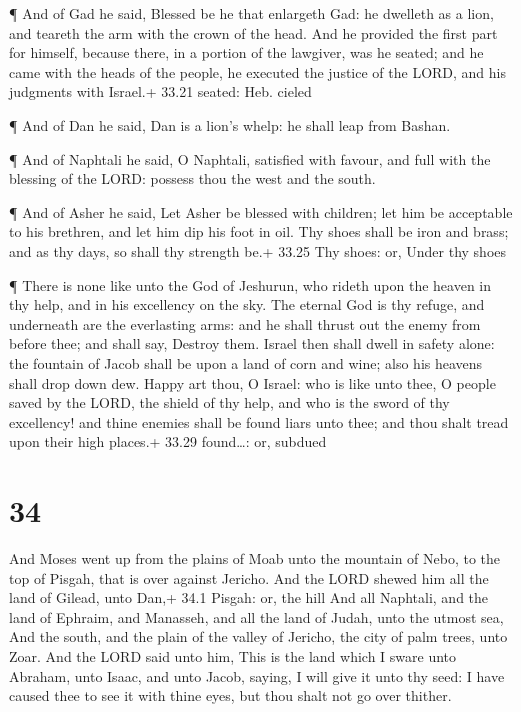  ¶ And of Gad he said, Blessed be he that enlargeth Gad: he
dwelleth as a lion, and teareth the arm with the crown of the head.
 And he provided the first part for himself, because there,
in a portion of the lawgiver, was he seated; and he came with the heads
of the people, he executed the justice of the LORD, and his judgments
with Israel.+ 33.21 seated: Heb. cieled

 ¶ And of Dan he said, Dan is a lion's whelp: he shall leap
from Bashan.

 ¶ And of Naphtali he said, O Naphtali, satisfied with
favour, and full with the blessing of the LORD: possess thou the west
and the south.

 ¶ And of Asher he said, Let Asher be blessed with
children; let him be acceptable to his brethren, and let him dip his
foot in oil.  Thy shoes shall be iron and brass; and as thy
days, so shall thy strength be.+ 33.25 Thy shoes: or, Under thy shoes

 ¶ There is none like unto the God of Jeshurun, who rideth
upon the heaven in thy help, and in his excellency on the sky.
 The eternal God is thy refuge, and underneath are the
everlasting arms: and he shall thrust out the enemy from before thee;
and shall say, Destroy them.  Israel then shall dwell in
safety alone: the fountain of Jacob shall be upon a land of corn and
wine; also his heavens shall drop down dew.  Happy art
thou, O Israel: who is like unto thee, O people saved by the LORD, the
shield of thy help, and who is the sword of thy excellency! and thine
enemies shall be found liars unto thee; and thou shalt tread upon their
high places.+ 33.29 found\ldots: or, subdued

\hypertarget{section-33}{%
\section{34}\label{section-33}}

 And Moses went up from the plains of Moab unto the mountain
of Nebo, to the top of Pisgah, that is over against Jericho. And the
LORD shewed him all the land of Gilead, unto Dan,+ 34.1 Pisgah: or, the
hill  And all Naphtali, and the land of Ephraim, and
Manasseh, and all the land of Judah, unto the utmost sea, 
And the south, and the plain of the valley of Jericho, the city of palm
trees, unto Zoar.  And the LORD said unto him, This is the
land which I sware unto Abraham, unto Isaac, and unto Jacob, saying, I
will give it unto thy seed: I have caused thee to see it with thine
eyes, but thou shalt not go over thither.

